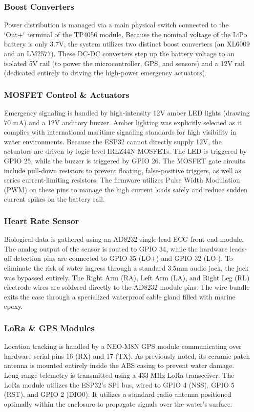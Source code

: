 \documentclass{article}
\begin{document}
\subsubsection{Boost Converters}
Power distribution is managed via a main physical switch connected to the `Out+` terminal of the TP4056 module. Because the nominal voltage of the LiPo battery is only 3.7V, the system utilizes two distinct boost converters (an XL6009 and an LM2577). These DC-DC converters step up the battery voltage to an isolated 5V rail (to power the microcontroller, GPS, and sensors) and a 12V rail (dedicated entirely to driving the high-power emergency actuators).

\subsubsection{MOSFET Control \& Actuators}
Emergency signaling is handled by high-intensity 12V amber LED lights (drawing 70 mA) and a 12V auditory buzzer. Amber lighting was explicitly selected as it complies with international maritime signaling standards for high visibility in water environments. Because the ESP32 cannot directly supply 12V, the actuators are driven by logic-level IRLZ44N MOSFETs. The LED is triggered by GPIO 25, while the buzzer is triggered by GPIO 26. The MOSFET gate circuits include pull-down resistors to prevent floating, false-positive triggers, as well as series current-limiting resistors. The firmware utilizes Pulse Width Modulation (PWM) on these pins to manage the high current loads safely and reduce sudden current spikes on the battery rail.

\subsubsection{Heart Rate Sensor}
Biological data is gathered using an AD8232 single-lead ECG front-end module. The analog output of the sensor is routed to GPIO 34, while the hardware leads-off detection pins are connected to GPIO 35 (LO+) and GPIO 32 (LO-). To eliminate the risk of water ingress through a standard 3.5mm audio jack, the jack was bypassed entirely. The Right Arm (RA), Left Arm (LA), and Right Leg (RL) electrode wires are soldered directly to the AD8232 module pins. The wire bundle exits the case through a specialized waterproof cable gland filled with marine epoxy.

\subsubsection{LoRa \& GPS Modules}
Location tracking is handled by a NEO-M8N GPS module communicating over hardware serial pins 16 (RX) and 17 (TX). As previously noted, its ceramic patch antenna is mounted entirely inside the ABS casing to prevent water damage. Long-range telemetry is transmitted using a 433 MHz LoRa transceiver. The LoRa module utilizes the ESP32's SPI bus, wired to GPIO 4 (NSS), GPIO 5 (RST), and GPIO 2 (DIO0). It utilizes a standard radio antenna positioned optimally within the enclosure to propagate signals over the water's surface.
\end{document}
